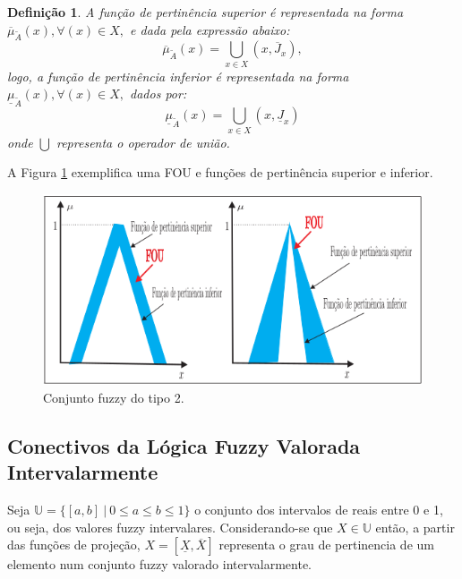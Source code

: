 \documentclass[tcc,capa]{texufpel}
\newtheorem{Def}{Defini\c c\~ao}
\begin{document}
\begin{Def}

A função de pertinência superior é representada na forma $\overline{\mu}_{\tilde{A}}(x), \forall (x) \in X,$ e dada pela expressão abaixo:
\begin{equation}
\overline{\mu}_{\tilde{A}}(x) = \bigcup_{x \in X} (x, \overline{J}_{x}),
\end{equation}logo, a função de pertinência inferior é representada na forma $\underline{\mu}_{\tilde{A}}(x), \forall (x) \in X,$ dados por:
\begin{equation}
\underline{\mu}_{\tilde{A}}(x) = \bigcup_{x \in X} (x, \underline{J}_{x})
\end{equation}onde $\bigcup$ representa o operador de união.
\end{Def}

A Figura \ref{fig:cf_tipo2} exemplifica uma FOU e funções de pertinência superior e inferior.

\begin{figure}[h]
\centering
\includegraphics[scale=0.6]{images/cf_tipo2.png}
\caption{Conjunto fuzzy do tipo 2.} %
\label{fig:cf_tipo2}
\end{figure}


\subsection{Conectivos da Lógica Fuzzy Valorada Intervalarmente}

Seja $\mathbb{U}=\{[a,b]~|~0\leq a\leq b\leq 1\}$ o conjunto dos intervalos de reais entre  0 e 1, ou seja, dos valores fuzzy intervalares. Considerando-se que $X \in \mathbb{U}$ então, a partir das funções de projeção, $X=[\underline{X},\overline{X}]$ representa o grau de pertinencia de um elemento num conjunto fuzzy valorado intervalarmente.
\end{document}
